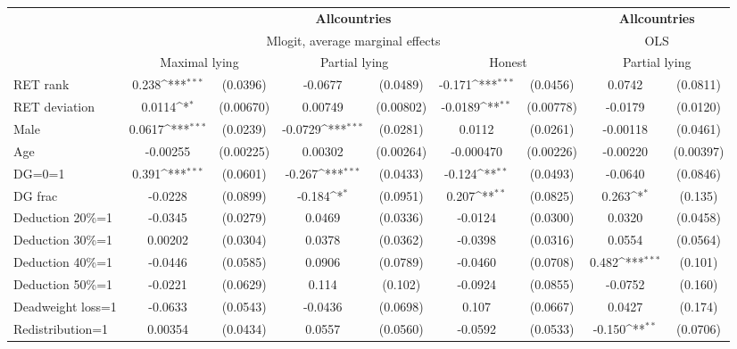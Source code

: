 \def\sym#1{\ifmmode^{#1}\else\(^{#1}\)\fi}
\begin{tabular}{l|cccccc|cc}
\hline\hline
&\multicolumn{6}{c|}{\bf All\space{}countries}&\multicolumn{2}{c}{\bf All\space{}countries}\\ &\multicolumn{6}{c|}{Mlogit, average marginal effects }&\multicolumn{2}{c}{OLS}\\
                &\multicolumn{2}{c}{Maximal lying}&\multicolumn{2}{c}{Partial lying}&\multicolumn{2}{c}{Honest}  &\multicolumn{2}{c}{Partial lying}\\
\hline
RET rank        &    0.238\sym{***}& (0.0396)&  -0.0677         & (0.0489)&   -0.171\sym{***}& (0.0456)&   0.0742         & (0.0811)\\
RET deviation   &   0.0114\sym{*}  &(0.00670)&  0.00749         &(0.00802)&  -0.0189\sym{**} &(0.00778)&  -0.0179         & (0.0120)\\
Male            &   0.0617\sym{***}& (0.0239)&  -0.0729\sym{***}& (0.0281)&   0.0112         & (0.0261)& -0.00118         & (0.0461)\\
Age             & -0.00255         &(0.00225)&  0.00302         &(0.00264)&-0.000470         &(0.00226)& -0.00220         &(0.00397)\\
DG=0=1          &    0.391\sym{***}& (0.0601)&   -0.267\sym{***}& (0.0433)&   -0.124\sym{**} & (0.0493)&  -0.0640         & (0.0846)\\
DG frac         &  -0.0228         & (0.0899)&   -0.184\sym{*}  & (0.0951)&    0.207\sym{**} & (0.0825)&    0.263\sym{*}  &  (0.135)\\
Deduction 20\%=1&  -0.0345         & (0.0279)&   0.0469         & (0.0336)&  -0.0124         & (0.0300)&   0.0320         & (0.0458)\\
Deduction 30\%=1&  0.00202         & (0.0304)&   0.0378         & (0.0362)&  -0.0398         & (0.0316)&   0.0554         & (0.0564)\\
Deduction 40\%=1&  -0.0446         & (0.0585)&   0.0906         & (0.0789)&  -0.0460         & (0.0708)&    0.482\sym{***}&  (0.101)\\
Deduction 50\%=1&  -0.0221         & (0.0629)&    0.114         &  (0.102)&  -0.0924         & (0.0855)&  -0.0752         &  (0.160)\\
Deadweight loss=1&  -0.0633         & (0.0543)&  -0.0436         & (0.0698)&    0.107         & (0.0667)&   0.0427         &  (0.174)\\
Redistribution=1&  0.00354         & (0.0434)&   0.0557         & (0.0560)&  -0.0592         & (0.0533)&   -0.150\sym{**} & (0.0706)\\

\end{tabular}
